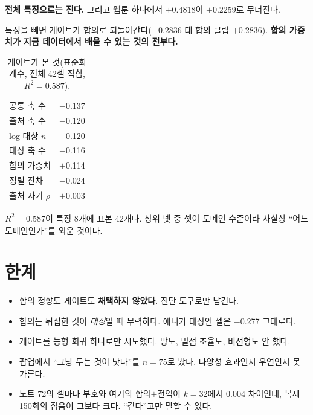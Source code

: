 \documentclass[10pt]{article}
\begin{document}
\textbf{전체 특징으로는 진다.} 그리고 웹툰 하나에서 $+$0.4818이 $+$0.2259로
무너진다.


특징을 빼면 게이트가 합의로 되돌아간다($+$0.2836 대 합의 클립 $+$0.2836).
\textbf{합의 가중치가 지금 데이터에서 배울 수 있는 것의 전부다.}

\begin{table}[t]
\centering\tsize
\caption{게이트가 본 것(표준화 계수, 전체 42셀 적합, $R^2{=}0.587$).}
\begin{tabular}{lr}
\toprule
공통 축 수 & $-$0.137 \\
출처 축 수 & $-$0.120 \\
log 대상 $n$ & $-$0.120 \\
대상 축 수 & $-$0.116 \\
합의 가중치 & $+$0.114 \\
정렬 잔차 & $-$0.024 \\
출처 자기 $\rho$ & $+$0.003 \\
\bottomrule
\end{tabular}
\end{table}

$R^2{=}0.587$이 특징 8개에 표본 42개다. 상위 넷 중 셋이 도메인 수준이라 사실상
``어느 도메인인가''를 외운 것이다.

\section{한계}

\begin{itemize}[leftmargin=1.1em,itemsep=0.15em]
\item 합의 정향도 게이트도 \textbf{채택하지 않았다}. 진단 도구로만 남긴다.
\item 합의는 뒤집힌 것이 \emph{대상}일 때 무력하다. 애니가 대상인 셀은 $-$0.277
      그대로다.
\item 게이트를 능형 회귀 하나로만 시도했다. 망도, 벌점 조율도, 비선형도 안 했다.
\item 팝업에서 ``그냥 두는 것이 낫다''를 $n{=}75$로 봤다. 다양성 효과인지
      우연인지 못 가른다.
\item 노트 72의 셀마다 부호와 여기의 합의$+$전역이 $k{=}32$에서 0.004 차이인데,
      복제 150회의 잡음이 그보다 크다. ``같다''고만 말할 수 있다.
\end{itemize}
\end{document}
